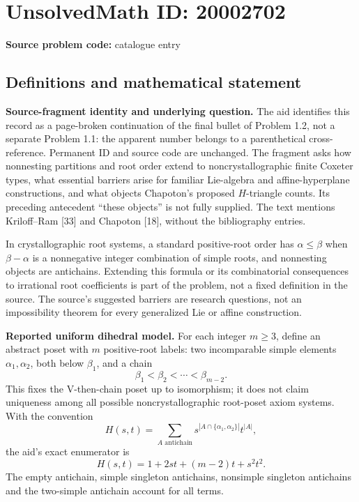 \documentclass[11pt]{article}
\begin{document}
\section*{UnsolvedMath ID: 20002702}
\textbf{Source problem code:} catalogue entry
\subsection{Definitions and mathematical statement}
\textbf{Source-fragment identity and underlying question.} The aid identifies this record as a page-broken continuation of the final bullet of Problem 1.2, not a separate Problem 1.1: the apparent number belongs to a parenthetical cross-reference. Permanent ID and source code are unchanged. The fragment asks how nonnesting partitions and root order extend to noncrystallographic finite Coxeter types, what essential barriers arise for familiar Lie-algebra and affine-hyperplane constructions, and what objects Chapoton's proposed \(H\)-triangle counts. Its preceding antecedent ``these objects'' is not fully supplied. The text mentions Kriloff--Ram [33] and Chapoton [18], without the bibliography entries.

In crystallographic root systems, a standard positive-root order has \(\alpha\leq\beta\) when \(\beta-\alpha\) is a nonnegative integer combination of simple roots, and nonnesting objects are antichains. Extending this formula or its combinatorial consequences to irrational root coefficients is part of the problem, not a fixed definition in the source. The source's suggested barriers are research questions, not an impossibility theorem for every generalized Lie or affine construction.

\textbf{Reported uniform dihedral model.} For each integer \(m\geq3\), define an abstract poset with \(m\) positive-root labels: two incomparable simple elements \(\alpha_1,\alpha_2\), both below \(\beta_1\), and a chain
\[
 \beta_1<\beta_2<\cdots<\beta_{m-2}.
\]
This fixes the V-then-chain poset up to isomorphism; it does not claim uniqueness among all possible noncrystallographic root-poset axiom systems. With the convention
\[
 H(s,t)=\sum_{A\text{ antichain}}s^{|A\cap\{\alpha_1,\alpha_2\}|}t^{|A|},
\]
the aid's exact enumerator is
\[
 H(s,t)=1+2st+(m-2)t+s^2t^2.
\]
The empty antichain, simple singleton antichains, nonsimple singleton antichains and the two-simple antichain account for all terms.
\end{document}
